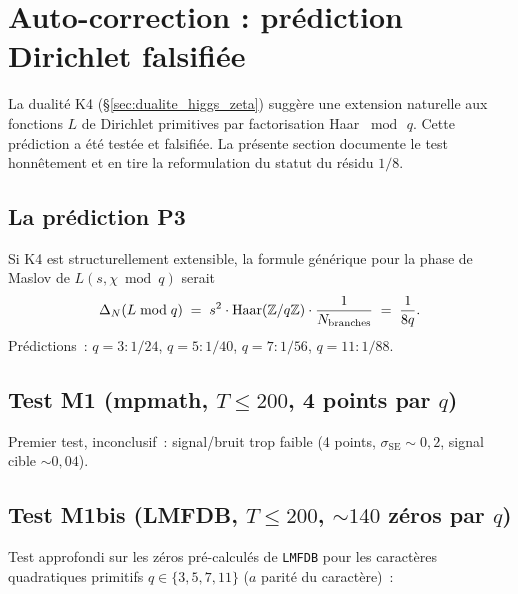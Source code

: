 \section{Auto-correction : prédiction Dirichlet falsifiée}
\label{sec:auto_correction_dirichlet}
\label{sec:auto_correction}

La dualité K4 (\S\ref{sec:dualite_higgs_zeta}) suggère une extension
naturelle aux fonctions $L$ de Dirichlet primitives par factorisation
Haar $\bmod\,q$. Cette prédiction a été testée et falsifiée. La présente
section documente le test honnêtement et en tire la reformulation du
statut du résidu $1/8$.

\subsection{La prédiction P3}
\label{sec:P3}

Si K4 est structurellement extensible, la formule générique pour la
phase de Maslov de $L(s, \chi \bmod q)$ serait
\begin{equation}
\Delta_N(L \bmod q) \;=\; s^{2} \cdot \mathrm{Haar}(\mathbb{Z}/q\mathbb{Z}) \cdot \dfrac{1}{N_{\mathrm{branches}}} \;=\; \dfrac{1}{8q}.
\label{eq:P3}
\end{equation}
Prédictions~: $q = 3 : 1/24$, $q = 5 : 1/40$, $q = 7 : 1/56$,
$q = 11 : 1/88$.

\subsection{Test M1 (mpmath, $T \le 200$, 4 points par $q$)}
\label{sec:M1}

Premier test, inconclusif~: signal/bruit trop faible (4 points,
$\sigma_{\mathrm{SE}} \sim 0{,}2$, signal cible $\sim 0{,}04$).

\subsection{Test M1bis (LMFDB, $T \le 200$, ${\sim} 140$ zéros par $q$)}
\label{sec:M1bis}

Test approfondi sur les zéros pré-calculés de \texttt{LMFDB} pour les
caractères quadratiques primitifs $q \in \{3, 5, 7, 11\}$ ($a$ parité du
caractère)~:


